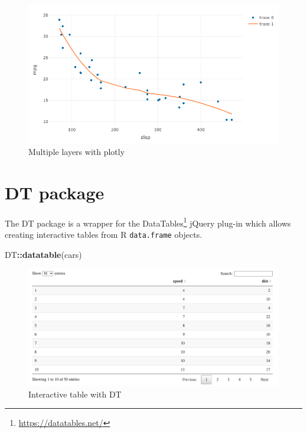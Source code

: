 \documentclass[10pt,]{krantz}
\makeatletter
\newenvironment{Shaded}{\begin{snugshade}}{\end{snugshade}}
\newcommand{\KeywordTok}[1]{\textcolor[rgb]{0.27,0.27,0.27}{\textbf{#1}}}
\newcommand{\NormalTok}[1]{#1}
\newcommand{\OperatorTok}[1]{\textcolor[rgb]{0.43,0.43,0.43}{\textbf{#1}}}
\renewcommand{\href}[2]{#2\footnote{\url{#1}}}
\newenvironment{kframe}{%
\medskip{}
\setlength{\fboxsep}{.8em}
 \def\at@end@of@kframe{}%
 \ifinner\ifhmode%
  \def\at@end@of@kframe{\end{minipage}}%
  \begin{minipage}{\columnwidth}%
 \fi\fi%
 \def\FrameCommand##1{\hskip\@totalleftmargin \hskip-\fboxsep
 \colorbox{shadecolor}{##1}\hskip-\fboxsep
     \hskip-\linewidth \hskip-\@totalleftmargin \hskip\columnwidth}%
 \MakeFramed {\advance\hsize-\width
   \@totalleftmargin\z@ \linewidth\hsize
   \@setminipage}}%
 {\par\unskip\endMakeFramed%
 \at@end@of@kframe}
\renewenvironment{Shaded}{\begin{kframe}}{\end{kframe}}
\makeatother
\begin{document}
\begin{figure}[H]

{\centering \includegraphics[width=1\linewidth]{images/03-plotly-multiple} 

}

\caption{Multiple layers with plotly}\label{fig:plotly-layers-diagram}
\end{figure}

\hypertarget{widgets-intro-dt}{%
\section{DT package}\label{widgets-intro-dt}}

The DT package \citep{R-DT} is a wrapper for the \href{https://datatables.net/}{DataTables} jQuery plug-in which allows creating interactive tables from R \texttt{data.frame} objects.

\begin{Shaded}
\begin{Highlighting}[]
\NormalTok{DT}\OperatorTok{::}\KeywordTok{datatable}\NormalTok{(cars)}
\end{Highlighting}
\end{Shaded}

\begin{figure}[H]

{\centering \includegraphics[width=1\linewidth]{images/03-DT} 

}

\caption{Interactive table with DT}\label{fig:plotly-dt-diagram}
\end{figure}
\end{document}
